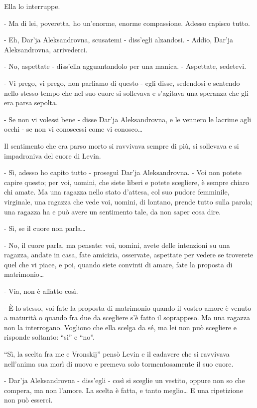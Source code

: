 Ella lo interruppe. 

- Ma di lei, poveretta, ho un'enorme, enorme compassione. Adesso capisco tutto. 

- Eh, Dar'ja Aleksandrovna, scusatemi - diss'egli alzandosi. - Addio, Dar'ja Aleksandrovna, arrivederci. 

- No, aspettate - diss'ella agguantandolo per una manica. - Aspettate, sedetevi. 

- Vi prego, vi prego, non parliamo di questo - egli disse, sedendosi e sentendo nello stesso tempo che nel suo cuore si sollevava e s'agitava una speranza che gli era parsa sepolta. 

- Se non vi volessi bene - disse Dar'ja Aleksandrovna, e le vennero le lacrime agli occhi - se non vi conoscessi come vi conosco\ldots{} 

Il sentimento che era parso morto si ravvivava sempre di più, si sollevava e si impadroniva del cuore di Levin. 

- Sì, adesso ho capito tutto - proseguì Dar'ja Aleksandrovna. - Voi non potete capire questo; per voi, uomini, che siete liberi e potete scegliere, è sempre chiaro chi amate. Ma una ragazza nello stato d'attesa, col suo pudore femminile, virginale, una ragazza che vede voi, uomini, di lontano, prende tutto sulla parola; una ragazza ha e può avere un sentimento tale, da non saper cosa dire. 

- Sì, se il cuore non parla\ldots{} 

- No, il cuore parla, ma pensate: voi, uomini, avete delle intenzioni su una ragazza, andate in casa, fate amicizia, osservate, aspettate per vedere se troverete quel che vi piace, e poi, quando siete convinti di amare, fate la proposta di matrimonio\ldots{} 

- Via, non è affatto così. 

- È lo stesso, voi fate la proposta di matrimonio quando il vostro amore è venuto a maturità o quando fra due da scegliere s'è fatto il soprappeso. Ma una ragazza non la interrogano. Vogliono che ella scelga da sé, ma lei non può scegliere e risponde soltanto: ``sì'' e ``no''. 

``Sì, la scelta fra me e Vronskij'' pensò Levin e il cadavere che si ravvivava nell'anima sua morì di nuovo e premeva solo tormentosamente il suo cuore. 

- Dar'ja Aleksandrovna - diss'egli - così si sceglie un vestito, oppure non so che compera, ma non l'amore. La scelta è fatta, e tanto meglio\ldots{} E una ripetizione non può esserci. 


